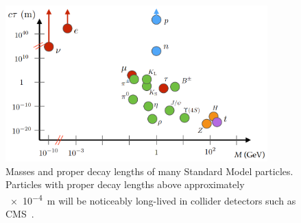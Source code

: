 \begin{figure}
\centering
\includegraphics[width=0.9\textwidth]{figures/intro/sm_llps.png}
\caption{Masses and proper decay lengths of many Standard Model particles. Particles with proper decay lengths above approximately \SI{e-4}{\m} will be noticeably long-lived in collider detectors such as CMS~\cite{shuve_sm_llp}.}
\label{sm_llps}
\end{figure}